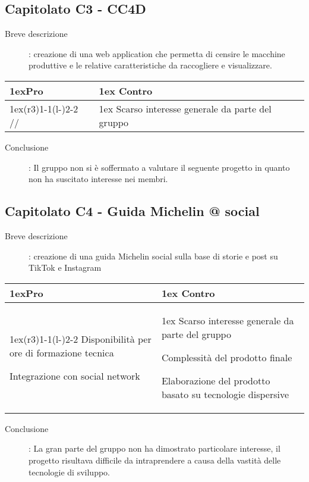 \subsection*{Capitolato C3 - CC4D}
\begin{description}
\item [Breve descrizione]: creazione di una web application che permetta di censire le macchine produttive e le relative caratteristiche da raccogliere e visualizzare.
\end{description}
\begin{table}[h]
\begin{tabularx}{\linewidth}{>{\parskip1ex}X@{\kern4\tabcolsep}>{\parskip1ex}X}
\hfil\bfseries Pro
&
\hfil\bfseries Contro
\\\cmidrule(r{3\tabcolsep}){1-1}\cmidrule(l{-\tabcolsep}){2-2}
 //
&
Scarso interesse generale da parte del gruppo \\
\end{tabularx}
\end{table}
\begin{description}
	\item [Conclusione]: Il gruppo non si è soffermato a valutare il seguente progetto in quanto non ha suscitato interesse nei membri.
\end{description}


\subsection*{Capitolato C4 - Guida Michelin @ social}
\begin{description}
\item [Breve descrizione]: creazione di una guida Michelin social sulla base di storie e post su TikTok e Instagram
\end{description}
\begin{table}[h]
\begin{tabularx}{\linewidth}{>{\parskip1ex}X@{\kern4\tabcolsep}>{\parskip1ex}X}
\hfil\bfseries Pro
&
\hfil\bfseries Contro
\\\cmidrule(r{3\tabcolsep}){1-1}\cmidrule(l{-\tabcolsep}){2-2}
Disponibilità per ore di formazione tecnica \par
Integrazione con social network 
&
Scarso interesse generale da parte del gruppo \par
Complessità del prodotto finale	\par
Elaborazione del prodotto basato su tecnologie dispersive \\
\end{tabularx}
\end{table}
\begin{description}
	\item [Conclusione]: La gran parte del gruppo non ha dimostrato particolare interesse, il progetto risultava difficile da intraprendere a causa della vastità delle tecnologie di sviluppo.
\end{description}


